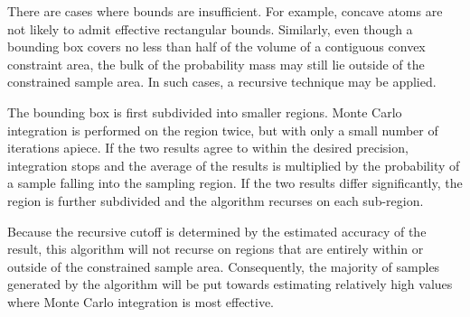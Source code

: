 There are  cases where bounds are insufficient.   For example, concave
atoms  are   not  likely   to  admit  effective   rectangular  bounds.
Similarly, even though a bounding box  covers no less than half of the
volume of a contiguous convex constraint area, the  bulk of the  probability mass may
still lie  outside of the constrained  sample area.  In  such cases, a
recursive technique may be applied.

The  bounding box  is first  subdivided into  smaller  regions.  Monte
Carlo integration  is performed on the  region twice, but  with only a
small number of iterations apiece.  If the two results agree to within
the  desired  precision, integration  stops  and  the  average of  the
results is multiplied by the  probability of a sample falling into the
sampling region.  If the  two results differ significantly, the region
is further subdivided and the algorithm recurses on each sub-region.

Because the  recursive cutoff is determined by  the estimated accuracy
of the  result, this  algorithm will not  recurse on regions  that are
entirely   within  or   outside  of   the  constrained   sample  area.
Consequently, the majority of  samples generated by the algorithm will
be  put towards estimating  relatively high  values where  Monte Carlo
integration is most effective.


